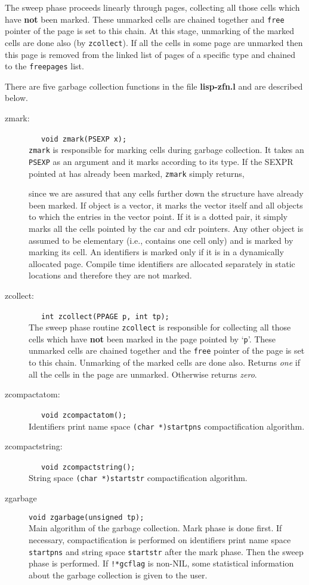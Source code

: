 The sweep phase proceeds linearly through pages, collecting all those cells
which have {\bf not} been marked. These unmarked cells are chained together
and {\tt free} pointer of the page is set to this chain. At this stage,
unmarking of the marked cells are done also (by {\tt zcollect}).
If all the cells in some page
are unmarked then this page is removed from the linked list of pages
of a specific type and
chained to the {\tt freepages} list.

There are five garbage collection functions in the file {\bf lisp-zfn.l}
and are described below.
\begin{description}
  \item[zmark:]\ \ \ {\tt void zmark(PSEXP x); } \\
    {\tt zmark} is responsible for marking cells during garbage collection.
    It takes an {\tt PSEXP} as an argument and it marks according to its type.
    If the SEXPR pointed at has already been marked, {\tt zmark} simply returns,

    since we
    are assured that any cells further down the structure have already
    been marked. If object
    is a vector, it marks the vector itself and all objects to which the
    entries in the vector point. If it is a dotted pair, it simply
    marks all the cells pointed by the car and cdr pointers.
    Any other object is assumed to be
    elementary (i.e., contains one cell only) and is marked by marking its
    cell. An identifiers is marked only if it is in a dynamically allocated
    page. Compile time identifiers are allocated separately in static
    locations and therefore they are not marked.
  \item[zcollect:]\ \ \  {\tt int zcollect(PPAGE p, int tp); } \\
    The sweep phase routine {\tt zcollect} is responsible for collecting
    all those cells which have {\bf not} been marked in the page pointed by
    `{\tt p}'. These unmarked cells are chained together
    and the {\tt free} pointer of the page is set to this chain.
    Unmarking of the marked cells are done also. Returns {\em one}
    if all the cells in the page are unmarked. Otherwise returns {\em zero}.
  \item[zcompactatom:]\ \ \ {\tt void zcompactatom(); } \\
    Identifiers print name space {\tt (char *)startpns} compactification
    algorithm.
  \item[zcompactstring:]\ \ \ {\tt void zcompactstring(); } \\
    String space {\tt (char *)startstr} compactification algorithm.
  \item[zgarbage] {\tt void zgarbage(unsigned tp); } \\
    Main algorithm of the garbage collection. Mark phase is done
    first. If necessary, compactification is performed on identifiers print
    name space {\tt startpns} and string space {\tt startstr} after the
    mark phase. Then the sweep phase is performed. If {\tt !*gcflag} is
    non-NIL, some statistical information about the garbage collection
    is given to the user.


\end{description}
